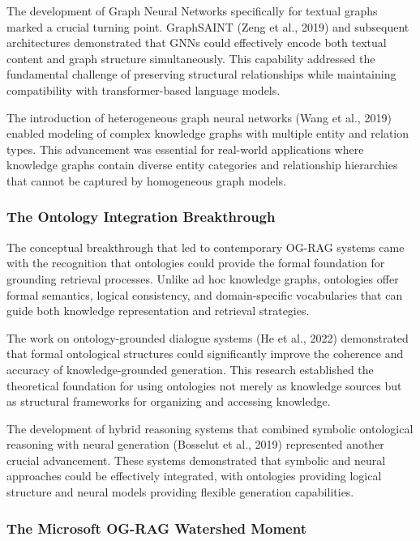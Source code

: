 \documentclass[12pt]{report}
\begin{document}
The development of Graph Neural Networks specifically for textual graphs marked a crucial turning point. GraphSAINT (Zeng et al., 2019) and subsequent architectures demonstrated that GNNs could effectively encode both textual content and graph structure simultaneously. This capability addressed the fundamental challenge of preserving structural relationships while maintaining compatibility with transformer-based language models.

The introduction of heterogeneous graph neural networks (Wang et al., 2019) enabled modeling of complex knowledge graphs with multiple entity and relation types. This advancement was essential for real-world applications where knowledge graphs contain diverse entity categories and relationship hierarchies that cannot be captured by homogeneous graph models.

\subsubsection{The Ontology Integration Breakthrough}

The conceptual breakthrough that led to contemporary OG-RAG systems came with the recognition that ontologies could provide the formal foundation for grounding retrieval processes. Unlike ad hoc knowledge graphs, ontologies offer formal semantics, logical consistency, and domain-specific vocabularies that can guide both knowledge representation and retrieval strategies.

The work on ontology-grounded dialogue systems (He et al., 2022) demonstrated that formal ontological structures could significantly improve the coherence and accuracy of knowledge-grounded generation. This research established the theoretical foundation for using ontologies not merely as knowledge sources but as structural frameworks for organizing and accessing knowledge.

The development of hybrid reasoning systems that combined symbolic ontological reasoning with neural generation (Bosselut et al., 2019) represented another crucial advancement. These systems demonstrated that symbolic and neural approaches could be effectively integrated, with ontologies providing logical structure and neural models providing flexible generation capabilities.

\subsubsection{The Microsoft OG-RAG Watershed Moment}
\end{document}
